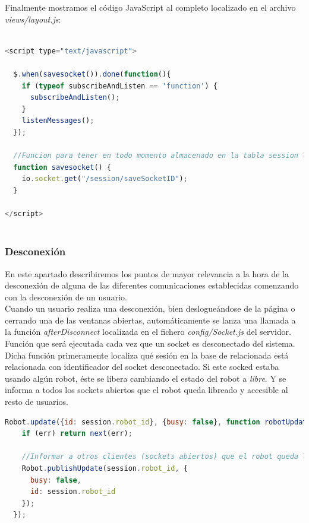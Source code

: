 Finalmente mostramos el código JavaScript al completo localizado en el archivo \emph{views/layout.js}:\\


\begin{lstlisting}[language=JavaScript]

<script type="text/javascript">

  $.when(savesocket()).done(function(){
    if (typeof subscribeAndListen == 'function') {
      subscribeAndListen();
    }
    listenMessages();
  });

  //Funcion para tener en todo momento almacenado en la tabla session los sockets conectados junto con el usuario al que pertenece
  function savesocket() {
    io.socket.get("/session/saveSocketID");
  }

</script>
 
\end{lstlisting} 
 
\subsubsection { Desconexión }
\label{sec:deconexion}

En este apartado describiremos los puntos de mayor relevancia a la hora de la desconexión de alguna de las diferentes comunicaciones establecidas comenzando con la desconexión de un usuario.\\

Cuando un usuario realiza una desconexión, bien deslogueándose de la página o cerrando una de las ventanas abiertas, automáticamente se lanza una llamada a la 
función \emph{afterDisconnect} localizada en el fichero \emph{config/Socket.js} del servidor. Función que será ejecutada cada vez que un socket es desconectado del sistema.\\

Dicha función primeramente localiza qué sesión en la base de relacionada está relacionada con identificador del socket desconectado. Si este socked estaba usando algún robot, éste se libera cambiando el estado
del robot a \emph{libre}. Y se informa a todos los sockets abiertos que el robot queda libreado y accesible al resto de usuarios.\\

\begin{lstlisting}[language=JavaScript]
  Robot.update({id: session.robot_id}, {busy: false}, function robotUpdated(err) {
    if (err) return next(err);

    //Informar a otros clientes (sockets abiertos) que el robot queda liberado
    Robot.publishUpdate(session.robot_id, {
      busy: false,
      id: session.robot_id
    });
  });
\end{lstlisting}


